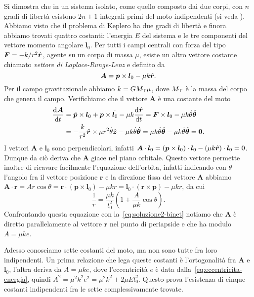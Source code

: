 {Si dimostra che in un sistema isolato, come quello composto dai due corpi, con
$n$ gradi di libertà esistono $2n+1$ integrali primi del moto indipendenti (si
veda \textcite{landau:meccanica}). Abbiamo visto che il problema di Keplero ha
due gradi di libertà e finora abbiamo trovati quattro costanti: l'energia $E$
del sistema e le tre componenti del vettore momento angolare $\bm{l}_0$. Per
tutti i campi centrali con forza del tipo $\bm{F} = -k/r^2\hat{\bm{r}}$, agente su
un corpo di massa $\mu$, esiste un altro vettore costante chiamato
\emph{vettore di Laplace-Runge-Lenz} e definito da
\begin{equation}
  \bm{A} = \bm{p}\times\bm{l}_0 - \mu k\hat{\bm{r}}.
\end{equation}
Per il campo gravitazionale abbiamo $k=GM_\textup{T}\mu$, dove $M_\textup{T}$ è
la massa del corpo che genera il campo. Verifichiamo che il vettore $\bm{A}$ è
una costante del moto
\begin{equation}
  \begin{split}
    \frac{{\mathop{}\!\mathrm{d}^{}}\bm{A}}{\mathop{}\!\mathrm{d} {t}^{}} &= \dot{\bm{p}}\times\bm{l}_0 + \bm{p}\times\dot{\bm{l}_0}
    - \mu k\frac{{\mathop{}\!\mathrm{d}^{}}\hat{\bm{r}}}{\mathop{}\!\mathrm{d} {t}^{}} = \bm{F}\times\bm{l}_0 - \mu
    k\dot{\theta}\hat{\bm{\theta}} \\
    &= -\frac{k}{r^2}\hat{\bm{r}}\times \mu r^2\dot{\theta}\hat{\bm{z}} -
    \mu k\dot{\theta}\hat{\bm{\theta}} = \mu k\dot{\theta}\hat{\bm{\theta}} -
    \mu k\dot{\theta}\hat{\bm{\theta}} = \bm{0}.
  \end{split}
\end{equation}
I vettori $\bm{A}$ e $\bm{l}_0$ sono perpendicolari, infatti
$\bm{A}\cdot\bm{l}_0 = (\bm{p}\times\bm{l}_0)\cdot\bm{l}_0 - (\mu
k\hat{\bm{r}})\cdot\bm{l}_0 = 0$.
Dunque da ciò deriva che $\bm{A}$ giace nel piano orbitale. Questo vettore
permette inoltre di ricavare facilmente l'equazione dell'orbita, infatti
indicando con $\theta$ l'angolo fra il vettore posizione $\bm{r}$ e la direzione
fissa del vettore $\bm{A}$ abbiamo
$\bm{A}\cdot\bm{r} = Ar\cos\theta = \bm{r}\cdot(\bm{p}\times\bm{l}_0) - \mu kr =
\bm{l}_0\cdot(\bm{r}\times\bm{p}) - \mu kr$, da cui
\begin{equation}
  \frac{1}{r} = \frac{\mu k}{l_0^2}
  \left(
    1 + \frac{A}{\mu k}\cos\theta
  \right).
\end{equation}
Confrontando questa equazione con la~\eqref{eq:soluzione2-binet} notiamo che
$\bm{A}$ è diretto parallelamente al vettore $\bm{r}$ nel punto di periapside e
che ha modulo $A = \mu ke$.

Adesso conosciamo sette costanti del moto, ma non sono tutte fra loro
indipendenti. Un prima relazione che lega queste costanti è l'ortogonalità fra
$\bm{A}$ e $\bm{l}_0$, l'altra deriva da $A = \mu ke$, dove l'eccentricità $e$ è
data dalla~\eqref{eq:eccentricita-energia}, quindi $A^2 = \mu^2k^2e^2 = \mu^2k^2
+ 2\mu El_0^2$. Questo prova l'esistenza di cinque costanti indipendenti fra le
sette complessivamente trovate.

}
